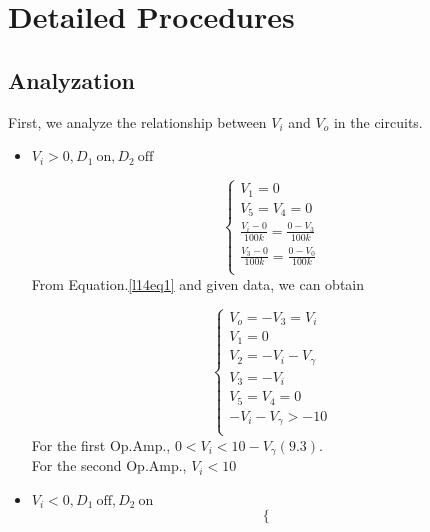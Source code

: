 \section{Detailed Procedures}
    \subsection{Analyzation}
    First, we analyze the relationship between $V_i$ and $V_o$ in the circuits.\par
    \begin{itemize}
        \item $V_i > 0, D_1~\text{on}, D_2~\text{off}$\par
            \begin{equation}
                \begin{cases}
                    V_1=0\\
                    V_5=V_4=0\\
                    \frac{V_i-0}{100k} = \frac{0-V_3}{100k}\\
                    \frac{V_3-0}{100k} = \frac{0-V_0}{100k}\\
                \end{cases}
                \label{l14eq1}
            \end{equation}
            From Equation.\ref{l14eq1} and given data, we can obtain\par
            \begin{equation}
                \begin{cases}
                    V_o=-V_3=V_i\\
                    V_1=0\\
                    V_2=-V_i-V_\gamma\\
                    V_3=-V_i\\
                    V_5=V_4=0\\
                    -V_i-V_\gamma > -10\\
                \end{cases}
                \label{l14ceq1}
            \end{equation}
            For the first Op.Amp., $0<V_i<10-V_\gamma(9.3)$.\\
            For the second Op.Amp., $V_i<10$\\
        \item $V_i < 0, D_1~\text{off}, D_2~\text{on}$
            \begin{equation}
                \begin{cases}

\end{cases}
\end{equation}
\end{itemize}
